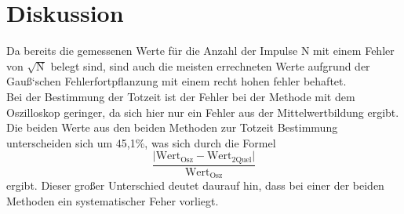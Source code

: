 \section{Diskussion}
\label{sec:Diskussion}
Da bereits die gemessenen Werte für die Anzahl der Impulse N mit einem Fehler
von $\sqrt{\text{N}}$ belegt sind, sind auch die meisten errechneten Werte aufgrund
der Gauß`schen Fehlerfortpflanzung mit einem recht hohen fehler behaftet. \\
Bei der Bestimmung der Totzeit ist der Fehler bei der Methode mit dem Oszilloskop
geringer, da sich hier nur ein Fehler aus der Mittelwertbildung ergibt.
Die beiden Werte aus den beiden Methoden zur Totzeit Bestimmung unterscheiden sich um 45,1\%,
was sich durch die Formel
\begin{equation*}
  \frac{\lvert \text{Wert}_{\text{Osz}}-\text{Wert}_{\text{2Quel}}\rvert}{\text{Wert}_{\text{Osz}}}
  \label{eqn:abw}
\end{equation*}
ergibt. Dieser großer Unterschied deutet daurauf hin, dass bei einer der beiden Methoden
ein systematischer Feher vorliegt. 
